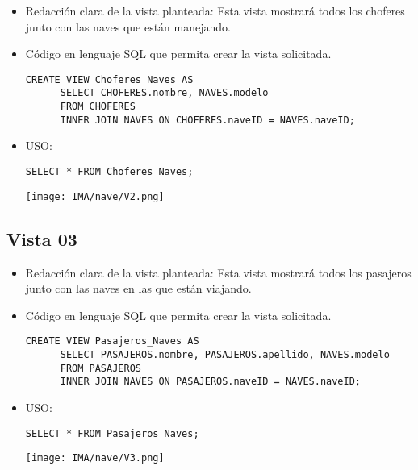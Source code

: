 \begin{itemize}
    \item Redacción clara de la vista planteada: Esta vista mostrará todos los choferes junto con las naves que están manejando.
    \item Código en lenguaje SQL que permita crear la vista solicitada.
    
    \begin{lstlisting}[caption={Tablas para la BdDatos}, label={lst:sql_estadios}]
      CREATE VIEW Choferes_Naves AS
      SELECT CHOFERES.nombre, NAVES.modelo
      FROM CHOFERES
      INNER JOIN NAVES ON CHOFERES.naveID = NAVES.naveID;      
    \end{lstlisting}    
    
    \item USO:
    
    \begin{lstlisting}[caption={Tablas para la BdDatos}, label={lst:sql_estadios}]
      SELECT * FROM Choferes_Naves;      
    \end{lstlisting}    

    \begin{center}
      \texttt{[image: IMA/nave/V2.png]}
    \end{center}
\end{itemize}


\subsection*{Vista 03}

\begin{itemize}
    \item Redacción clara de la vista planteada: Esta vista mostrará todos los pasajeros junto con las naves en las que están viajando.
    \item Código en lenguaje SQL que permita crear la vista solicitada.
    
    \begin{lstlisting}[caption={Tablas para la BdDatos}, label={lst:sql_estadios}]
      CREATE VIEW Pasajeros_Naves AS
      SELECT PASAJEROS.nombre, PASAJEROS.apellido, NAVES.modelo
      FROM PASAJEROS
      INNER JOIN NAVES ON PASAJEROS.naveID = NAVES.naveID;      
    \end{lstlisting}    
    
    \item USO:
    
    \begin{lstlisting}[caption={Tablas para la BdDatos}, label={lst:sql_estadios}]
      SELECT * FROM Pasajeros_Naves;
    \end{lstlisting}    

    \begin{center}
      \texttt{[image: IMA/nave/V3.png]}
    \end{center}
\end{itemize}